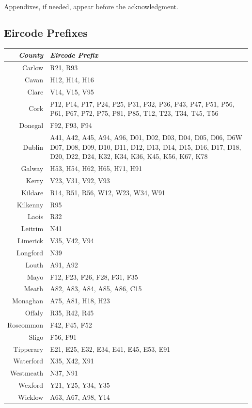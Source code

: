 \documentclass[twocolumn]{article}
\begin{document}
Appendixes, if needed, appear before the acknowledgment.



\raggedright

\begin{appendices}
\section{Eircode Prefixes\label{a:eircode}}
\begin{tabularx}{0.5\textwidth}{r X}
    \textit{County} & \textit{Eircode Prefix} \\ \hline
    Carlow & R21, R93 \\ \hline
    Cavan & H12, H14, H16 \\ \hline
    Clare & V14, V15, V95 \\ \hline
    Cork & P12, P14, P17, P24, P25, P31, P32, P36, P43, P47, P51, P56, P61, P67, P72, P75, P81, P85, T12, T23, T34, T45, T56 \\ \hline
    Donegal & F92, F93, F94 \\ \hline
    Dublin & A41, A42, A45, A94, A96, D01, D02, D03, D04, D05, D06, D6W D07, D08, D09, D10, D11, D12, D13, D14, D15, D16, D17, D18, D20, D22, D24, K32, K34, K36, K45, K56, K67, K78 \\ \hline
    Galway & H53, H54, H62, H65, H71, H91 \\ \hline
    Kerry & V23, V31, V92, V93 \\ \hline
    Kildare & R14, R51, R56, W12, W23, W34, W91 \\ \hline
    Kilkenny & R95 \\ \hline
    Laois & R32 \\ \hline
    Leitrim & N41 \\ \hline
    Limerick & V35, V42, V94 \\ \hline
    Longford & N39 \\ \hline
    Louth & A91, A92 \\ \hline
    Mayo & F12, F23, F26, F28, F31, F35 \\ \hline
    Meath & A82, A83, A84, A85, A86, C15 \\ \hline
    Monaghan & A75, A81, H18, H23 \\ \hline
    Offaly & R35, R42, R45 \\ \hline
    Roscommon & F42, F45, F52 \\ \hline
    Sligo & F56, F91 \\ \hline
    Tipperary & E21, E25, E32, E34, E41, E45, E53, E91 \\ \hline
    Waterford & X35, X42, X91 \\ \hline
    Westmeath & N37, N91 \\ \hline
    Wexford & Y21, Y25, Y34, Y35 \\ \hline
    Wicklow & A63, A67, A98, Y14
\end{tabularx}

\end{appendices}
\end{document}

